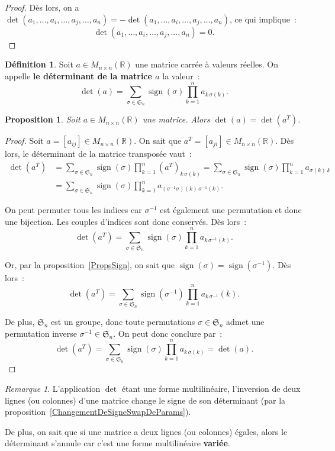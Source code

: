 \documentclass{article}
\DeclareMathOperator{\sign}{sign}
\newcommand{\R}{\mathbb R}
\newcommand{\M}[3]{M_{#1 \times #2}(#3)}
\newcommand{\Perm}{\mathfrak{S}}
\newtheorem{prp}[thm]{Proposition}
\theoremstyle{definition}
\newtheorem{déf}[thm]{Définition}
\theoremstyle{remark}
\newtheorem*{rmq}{Remarque}
\begin{document}
\begin{proof}
		Dès lors, on a $\det(a_1, \ldots, a_i, \ldots, a_j, \ldots, a_n) = -\det(a_1, \ldots, a_i, \ldots, a_j, \ldots, a_n)$, ce qui implique~:
		\[\det(a_1, \ldots, a_i, \ldots, a_j, \ldots, a_n) = 0.\] \end{proof}

		\begin{déf} Soit $a \in \M nn\R$ une matrice carrée à valeurs réelles. On appelle \textbf{le déterminant de la matrice $a$} la valeur~:
		\[\det(a) = \sum_{\sigma\in\Perm_n}\sign(\sigma)\prod_{k=1}^na_{k\,\sigma(k)}.\] \end{déf}

		\begin{prp} Soit $a \in \M nn\R$ une matrice. Alors $\det(a) = \det(a^T)$. \end{prp}

		\begin{proof} Soit $a = [a_{ij}] \in \M nn\R$. On sait que $a^T = [a_{ji}] \in \M nn\R$. Dès lors, le déterminant de la matrice transposée vaut~:
		\[\begin{aligned}
			\det(a^T) &= \sum_{\sigma\in\Perm_n}\sign(\sigma)\prod_{k=1}^n(a^T)_{k\,\sigma(k)} = \sum_{\sigma\in\Perm_n}\sign(\sigma)\prod_{k=1}^na_{\sigma(k)\,k} \\
			          &= \sum_{\sigma\in\Perm_n}\sign(\sigma)\prod_{k=1}^na_{(\sigma^{-1}\sigma)(k)\,\sigma^{-1}(k)}.
		\end{aligned}\]

		On peut permuter tous les indices car $\sigma^{-1}$ est également une permutation et donc une bijection. Les couples d'indices sont donc conservés. Dès lors~:
		\[\det(a^T) = \sum_{\sigma\in\Perm_n}\sign(\sigma)\prod_{k=1}^na_{k\,\sigma^{-1}(k)}.\]

		Or, par la proposition~\ref{PropsSign}, on sait que $\sign(\sigma) = \sign(\sigma^{-1})$. Dès lors~:
		\[\det(a^T) = \sum_{\sigma\in\Perm_n}\sign(\sigma^{-1})\prod_{k=1}^na_{k\,\sigma^{-1}}(k).\]

		De plus, $\Perm_n$ est un groupe, donc toute permutations $\sigma \in \Perm_n$ admet une permutation inverse $\sigma^{-1} \in \Perm_n$.
		On peut donc conclure par~:
		\[\det(a^T) = \sum_{\sigma\in\Perm_n}\sign(\sigma)\prod_{k=1}^na_{k\,\sigma(k)} = \det(a).\] \end{proof}

		\begin{rmq} L'application $\det$ étant une forme multilinéaire, l'inversion de deux lignes (ou colonnes) d'une matrice change le signe de son déterminant
		(par la proposition~\ref{ChangementDeSigneSwapDeParams}).
		
		De plus, on sait que si une matrice a deux lignes (ou colonnes) égales, alors le déterminant s'annule car c'est une forme multilinéaire \textbf{variée}. \end{rmq}
\end{document}

